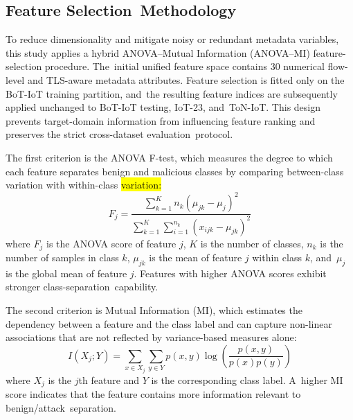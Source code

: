\documentclass[futureinternet,article,accept,moreauthors]{Definitions/mdpi}
\begin{document}
\subsection{Feature Selection~Methodology}

To reduce dimensionality and mitigate noisy or redundant metadata variables, this study applies a hybrid ANOVA--Mutual Information (ANOVA--MI) feature-selection procedure. The~initial unified feature space contains 30 numerical flow-level and TLS-aware metadata attributes. Feature selection is fitted only on the BoT-IoT training partition, and~the resulting feature indices are subsequently applied unchanged to BoT-IoT testing, IoT-23, and~ToN-IoT. This design prevents target-domain information from influencing feature ranking and preserves the strict cross-dataset evaluation~protocol.

The first criterion is the ANOVA F-test, which measures the degree to which each feature separates benign and malicious classes by comparing between-class variation with within-class \hl{variation:} %
\begin{equation}
F_j =
\frac{
\sum_{k=1}^{K} n_k (\mu_{jk} - \mu_j)^2
}{
\sum_{k=1}^{K} \sum_{i=1}^{n_k} (x_{ijk} - \mu_{jk})^2
}
\end{equation}
where $F_j$ is the ANOVA score of feature $j$, $K$ is the number of classes, $n_k$ is the number of samples in class $k$, $\mu_{jk}$ is the mean of feature $j$ within class $k$, and~$\mu_j$ is the global mean of feature $j$. Features with higher ANOVA scores exhibit stronger class-separation~capability.

The second criterion is Mutual Information (MI), which estimates the dependency between a feature and the class label and can capture non-linear associations that are not reflected by variance-based measures alone:
\begin{equation}
I(X_j;Y) =
\sum_{x \in X_j}
\sum_{y \in Y}
p(x,y)
\log
\left(
\frac{p(x,y)}{p(x)p(y)}
\right)
\end{equation}
where $X_j$ is the $j$th feature and $Y$ is the corresponding class label. A~higher MI score indicates that the feature contains more information relevant to benign/attack~separation.
\end{document}
